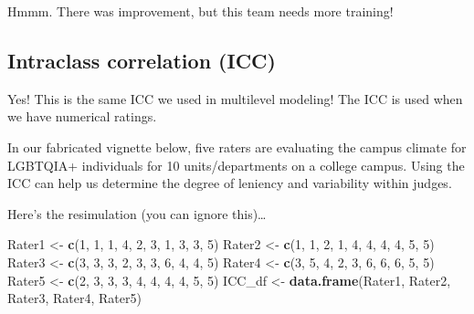 \documentclass[
  english,
]{book}
\newenvironment{Shaded}{\begin{snugshade}}{\end{snugshade}}
\newcommand{\DecValTok}[1]{\textcolor[rgb]{0.00,0.00,0.81}{#1}}
\newcommand{\KeywordTok}[1]{\textcolor[rgb]{0.13,0.29,0.53}{\textbf{#1}}}
\newcommand{\NormalTok}[1]{#1}
\newcommand{\StringTok}[1]{\textcolor[rgb]{0.31,0.60,0.02}{#1}}
\begin{document}
Hmmm. There was improvement, but this team needs more training!

\hypertarget{intraclass-correlation-icc}{%
\subsection{Intraclass correlation (ICC)}\label{intraclass-correlation-icc}}

Yes! This is the same ICC we used in multilevel modeling! The ICC is used when we have numerical ratings.

In our fabricated vignette below, five raters are evaluating the campus climate for LGBTQIA+ individuals for 10 units/departments on a college campus. Using the ICC can help us determine the degree of leniency and variability within judges.

Here's the resimulation (you can ignore this)\ldots{}

\begin{Shaded}
\begin{Highlighting}[]
\NormalTok{Rater1 <-}\StringTok{ }\KeywordTok{c}\NormalTok{(}\DecValTok{1}\NormalTok{, }\DecValTok{1}\NormalTok{, }\DecValTok{1}\NormalTok{, }\DecValTok{4}\NormalTok{, }\DecValTok{2}\NormalTok{, }\DecValTok{3}\NormalTok{, }\DecValTok{1}\NormalTok{, }\DecValTok{3}\NormalTok{, }\DecValTok{3}\NormalTok{, }\DecValTok{5}\NormalTok{)}
\NormalTok{Rater2 <-}\StringTok{ }\KeywordTok{c}\NormalTok{(}\DecValTok{1}\NormalTok{, }\DecValTok{1}\NormalTok{, }\DecValTok{2}\NormalTok{, }\DecValTok{1}\NormalTok{, }\DecValTok{4}\NormalTok{, }\DecValTok{4}\NormalTok{, }\DecValTok{4}\NormalTok{, }\DecValTok{4}\NormalTok{, }\DecValTok{5}\NormalTok{, }\DecValTok{5}\NormalTok{)}
\NormalTok{Rater3 <-}\StringTok{ }\KeywordTok{c}\NormalTok{(}\DecValTok{3}\NormalTok{, }\DecValTok{3}\NormalTok{, }\DecValTok{3}\NormalTok{, }\DecValTok{2}\NormalTok{, }\DecValTok{3}\NormalTok{, }\DecValTok{3}\NormalTok{, }\DecValTok{6}\NormalTok{, }\DecValTok{4}\NormalTok{, }\DecValTok{4}\NormalTok{, }\DecValTok{5}\NormalTok{)}
\NormalTok{Rater4 <-}\StringTok{ }\KeywordTok{c}\NormalTok{(}\DecValTok{3}\NormalTok{, }\DecValTok{5}\NormalTok{, }\DecValTok{4}\NormalTok{, }\DecValTok{2}\NormalTok{, }\DecValTok{3}\NormalTok{, }\DecValTok{6}\NormalTok{, }\DecValTok{6}\NormalTok{, }\DecValTok{6}\NormalTok{, }\DecValTok{5}\NormalTok{, }\DecValTok{5}\NormalTok{)}
\NormalTok{Rater5 <-}\StringTok{ }\KeywordTok{c}\NormalTok{(}\DecValTok{2}\NormalTok{, }\DecValTok{3}\NormalTok{, }\DecValTok{3}\NormalTok{, }\DecValTok{3}\NormalTok{, }\DecValTok{4}\NormalTok{, }\DecValTok{4}\NormalTok{, }\DecValTok{4}\NormalTok{, }\DecValTok{4}\NormalTok{, }\DecValTok{5}\NormalTok{, }\DecValTok{5}\NormalTok{)}
\NormalTok{ICC_df <-}\StringTok{ }\KeywordTok{data.frame}\NormalTok{(Rater1, Rater2, Rater3, Rater4, Rater5)}
\end{Highlighting}
\end{Shaded}
\end{document}
